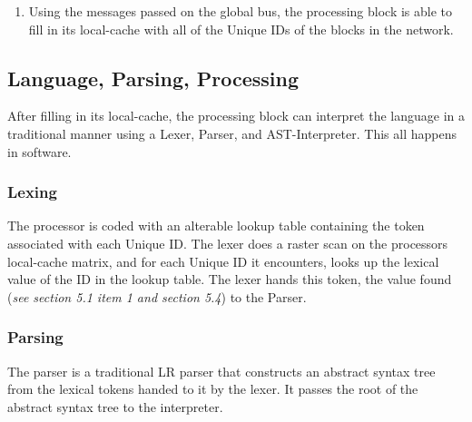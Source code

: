 \begin{enumerate}
\begin{enumerate}
          \item Until the end of the line is reached, whenever a block receives a vector from its western neighbor, each block increments the x component of its position vector, emits a message on the global bus containing \begin{verbatim}[position vector, unique ID]\end{verbatim}then passes its position vector to its eastern neighbor.
          \item The last block on the line increments the x component of its position vector, then emits a message on the global bus containing \begin{verbatim}[position vector, unique ID, END_OF_DIMENSION]\end{verbatim}
        \end{enumerate}
      \item Using the messages passed on the global bus, the processing block is able to fill in its local-cache with all of the Unique IDs of the blocks in the network.
      \end{enumerate}
  \subsection{Language, Parsing, Processing}
    After filling in its local-cache, the processing block can interpret the language in a traditional manner using a Lexer, Parser, and AST-Interpreter. This all happens in software.
    \subsubsection{Lexing}
      The processor is coded with an alterable lookup table containing the token associated with each Unique ID. The lexer does a raster scan on the processors local-cache matrix, and for each Unique ID it encounters, looks up the lexical value of the ID in the lookup table. The lexer hands this token, the value found (\textit{see section 5.1 item 1 and section 5.4}) to the Parser.
    \subsubsection{Parsing}
      The parser is a traditional LR parser that constructs an abstract syntax tree from the lexical tokens handed to it by the lexer. It passes the root of the abstract syntax tree to the interpreter.
